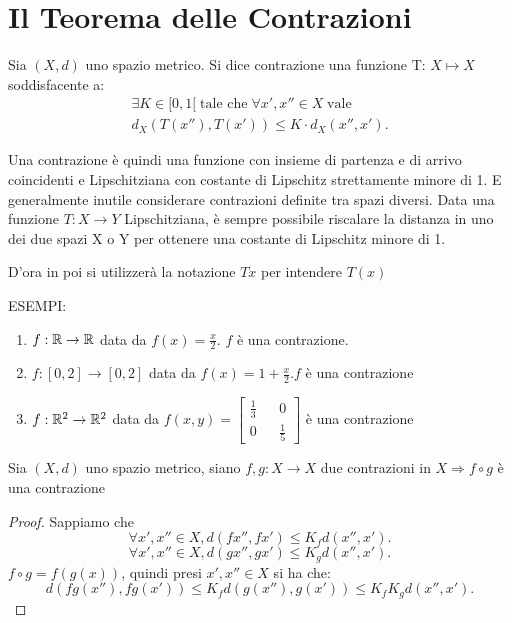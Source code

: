\section{Il Teorema delle Contrazioni}
\begin{definition}[Contrazione]
	\label{def:contrazione}
	Sia $(X, d)$ uno spazio metrico. Si dice contrazione una funzione T: $X \mapsto X$ soddisfacente a:
	\begin{align}
		\label{equaz:def_contrazione}
		\exists K \in [0, 1[\;\text{tale che}\;\forall x',x''\in X\;\text{vale}\\
		d_X(T(x''), T(x')) \le K \cdot d_X(x'', x').
	\end{align}


	Una contrazione è quindi una funzione con insieme di partenza e di arrivo coincidenti e
	Lipschitziana con costante di Lipschitz strettamente minore di 1.
	E generalmente inutile considerare contrazioni definite tra spazi diversi. Data una funzione
	$T: X\rightarrow Y$ Lipschitziana, è sempre possibile riscalare la distanza in uno dei due spazi X o Y
	per ottenere una costante di Lipschitz minore di 1.
	\begin{note}
		D'ora in poi si utilizzerà la notazione $Tx$ per intendere $T(x)$
	\end{note}
\end{definition}

ESEMPI:\\
\begin{enumerate}
	\item $f: \mathbb{R} \rightarrow \mathbb{R}$ data da $f(x) = \frac{x}{2}$. $f$ è una contrazione.
	\item $f: [0,2] \rightarrow [0,2]$ data da $f(x) = 1+\frac{x}{2}. f$ è una contrazione
	\item $f: \mathbb{R}^2 \rightarrow \mathbb{R}^2$ data da $f(x,y)=\begin{bmatrix} \frac{1}{3}&&0\\0&&\frac{1}{5}\end{bmatrix}$ è una contrazione
\end{enumerate}

\proposition
Sia $(X, d)$ uno spazio metrico, siano $f,g:X\rightarrow X$ due contrazioni in $X \Rightarrow f\circ g$ è una contrazione
\begin{proof}
	Sappiamo che\\
	$$\forall x',x''\in X, d(fx'', fx')\le K_fd(x'', x').$$
	$$\forall x',x''\in X, d(gx'', gx')\le K_gd(x'', x').$$
	$f\circ g=f(g(x))$, quindi presi $x',x''\in X$ si ha che: $$d(fg(x''), fg(x'))\le K_fd(g(x''), g(x'))\le K_fK_gd(x'',x').$$
\end{proof}

